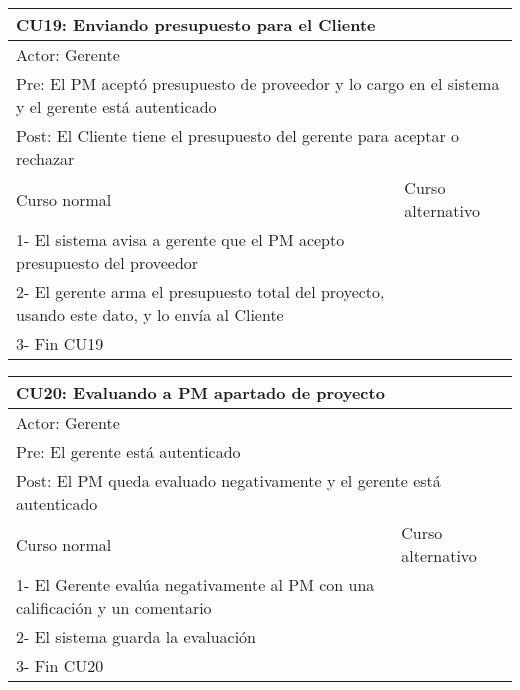 \begin{table}[H]
  \begin{adjustbox}{max width = \textwidth}
  \begin{tabular}{|l|l|}
    \hline
    \multicolumn{2}{|l|}{CU19: Enviando presupuesto para el Cliente} \\\hline
    \multicolumn{2}{|l|}{Actor: Gerente} \\\hline
    \multicolumn{2}{|l|}{Pre: El PM aceptó presupuesto de proveedor y lo cargo en el sistema y el gerente está autenticado} \\\hline
    \multicolumn{2}{|l|}{Post: El Cliente tiene el presupuesto del gerente para aceptar o rechazar} \\\hline
     Curso normal & Curso alternativo\\ \hline
	 1- El sistema avisa a gerente que el PM acepto presupuesto del proveedor & \\ \hline
	 2- El gerente arma el presupuesto total del proyecto, usando este dato, y lo envía al Cliente & \\ \hline
   3- Fin CU19 & \\ \hline
 \end{tabular}
  \end{adjustbox}
\end{table}

\begin{table}[H]
  \begin{adjustbox}{max width = \textwidth}
  \begin{tabular}{|l|l|}
    \hline
    \multicolumn{2}{|l|}{CU20: Evaluando a PM apartado de proyecto} \\\hline
    \multicolumn{2}{|l|}{Actor: Gerente} \\\hline
    \multicolumn{2}{|l|}{Pre: El gerente está autenticado} \\\hline
    \multicolumn{2}{|l|}{Post: El PM queda evaluado negativamente y el gerente está autenticado} \\\hline
     Curso normal & Curso alternativo\\ \hline
  	 1- El Gerente evalúa negativamente al PM con una calificación y un comentario& \\ \hline
  	 2- El sistema guarda la evaluación &\\ \hline
     3- Fin CU20 & \\ \hline
 \end{tabular}
  \end{adjustbox}
\end{table}

